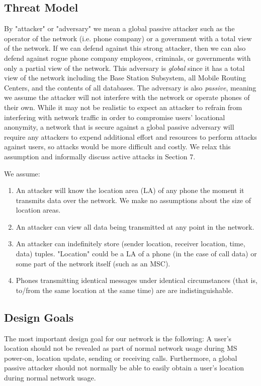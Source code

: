 \documentclass[11pt]{article}
\begin{document}
\subsection{Threat Model}
By "attacker" or "adversary" we mean a global passive attacker such as the operator of the network (i.e. phone company) or a government with a total view of the network. If we can defend against this strong attacker, then we can also defend against rogue phone company employees, criminals, or governments with only a partial view of the network. This adversary is \textit{global} since it has a total view of the network including the Base Station Subsystem, all Mobile Routing Centers, and the contents of all databases. The adversary is also \textit{passive}, meaning we assume the attacker will not interfere with the network or operate phones of their own. While it may not be realistic to expect an attacker to refrain from interfering with network traffic in order to compromise users' locational anonymity, a network that is secure against a global passive adversary will require any attackers to expend additional effort and resources to perform attacks against users, so attacks would be more difficult and costly. We relax this assumption and informally discuss active attacks in Section 7.

    We assume:
\begin{enumerate}
\item
An attacker will know the location area (LA) of any phone the moment it transmits data over the network. We make no assumptions about the size of location areas.
\item
An attacker can view all data being transmitted at any point in the network.
\item
	An attacker can indefinitely store (sender location, receiver location, time, data) tuples. "Location" could be a LA of a phone (in the case of call data) or some part of the network itself (such as an MSC).
\item
	Phones transmitting identical messages under identical circumstances (that is, to/from the same location at the same time) are are indistinguishable.

\end{enumerate}

\subsection{Design Goals}

The most important design goal for our network is the following: A user's location should not be revealed as part of normal network usage during MS power-on, location update, sending or receiving calls. Furthermore, a global passive attacker should not normally be able to easily obtain a user's location during normal network usage.
\end{document}
